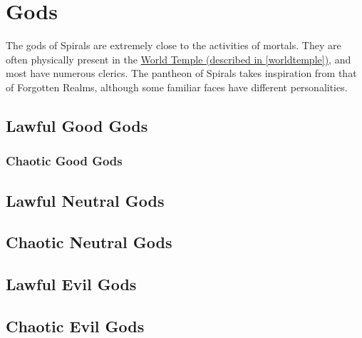 \chapter{Gods}
The gods of Spirals are extremely close to the activities of mortals.
They are often physically present in the \hyperref[worldtemple]{World Temple (described in \autoref{worldtemple})}, and most have numerous clerics.
The pantheon of Spirals takes inspiration from that of Forgotten Realms, although some familiar faces have different personalities.


\begin{multicols}{2}

\section{Lawful Good Gods}


\subsection{Chaotic Good Gods}


\section{Lawful Neutral Gods}


\section{Chaotic Neutral Gods}



\section{Lawful Evil Gods}


\section{Chaotic Evil Gods}


\end{multicols}